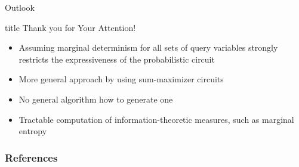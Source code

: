 \documentclass[aspectratio=169]{beamer}
\begin{document}
  \begin{frame}{Outlook}
    \begin{beamercolorbox}[sep=8pt,center,shadow=true,rounded=true]{title}
      Thank you for Your Attention!%
      \par%
    \end{beamercolorbox}
    \begin{itemize}
      \item Assuming marginal determinism for all sets of query variables strongly restricts the expressiveness of the probabilistic circuit
      \item More general approach by using sum-maximizer circuits
      \item No general algorithm how to generate one
      \item Tractable computation of information-theoretic measures, such as marginal entropy
    \end{itemize}
  \end{frame}

\setcounter{backupcounter}{\value{framenumber}}

\begin{frame}[plain]
  \frametitle{References}
    \nocite{*}
    \printbibliography
\end{frame}

\setcounter{framenumber}{\value{backupcounter}}
\end{document}
